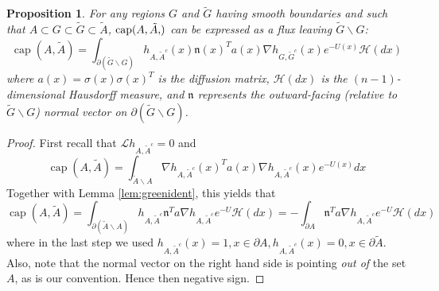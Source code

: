 \documentclass[nofootinbib,english, aip, jcp, priprint, graphicx,floatfix]{revtex4-1}
\newcommand{\tmop}[1]{\ensuremath{\operatorname{#1}}}
\newtheorem{proposition}{Proposition}
\theoremstyle{plain}
\theoremstyle{definition}
\theoremstyle{plain}
\newcommand{\normal}{{\mathfrak{n}}}
\newcommand{\capac}[2]{\ensuremath{\operatorname{cap}}(#1,#2)}
\newcommand{\hausdorffmeasure}{\mathscr{H}(dx)}
\newcommand{\tA}{{\tilde A}}
\begin{document}
\def\theproposition{\ref{prop:flux}}
\begin{proposition}
For any regions $G$ and $\tilde{G}$ having smooth boundaries and such that $A\subset G \subset \tilde G \subset \tilde A$, $\capac{A,\tA}$ can be expressed as a flux leaving $\tilde G \backslash G$:
\[
\ensuremath{\operatorname{cap}} (A, \tilde{A}) = \int_{\partial (\tilde G \backslash G)}  h_{A, \tilde{A}^c} (x)   \normal(x)^T a (x) \nabla h_{G, \tilde{G}^c} (x)e^{- U (x)} \hausdorffmeasure
\]
where $a(x)=\sigma(x)\sigma(x)^T$ is the diffusion matrix, $\hausdorffmeasure$ is the $(n-1)$-dimensional Hausdorff measure, and $\normal$ represents the outward-facing (relative to $\tilde G \backslash G$) normal vector on $\partial (\tilde G \backslash G)$.
\end{proposition}
\addtocounter{proposition}{-1}
\begin{proof}
First recall that $\mathcal{L} h_{A, \tilde{A}^c} = 0$ and
\begin{equation*}
	\tmop{cap}(A,\tilde A) = \int_{\tilde A \backslash A} \nabla h_{A, \tilde{A}^c} (x)^T a(x) \nabla h_{A, \tilde{A}^c} (x) e^{-U(x)} dx
\end{equation*}
Together with Lemma \ref{lem:greenident}, this yields that
\begin{equation}\label{eq:lemmaproof}
\tmop{cap}(A,\tilde A)  = \int_{\partial (\tilde A \backslash A)}  h_{A, \tilde{A}^c} \normal^T a  \nabla h_{A, \tilde{A}^c} e^{- U } \hausdorffmeasure = -\int_{\partial A}  \normal^T a  \nabla h_{A, \tilde{A}^c} e^{- U } \hausdorffmeasure
\end{equation}
where in the last step we used $h_{A,\tilde A^c}(x)=1,x\in \partial A,h_{A,\tilde A^c}(x)=0,x\in \partial \tilde A$.  Also, note that the normal vector on the right hand side is pointing {\em out of} the set $A$, as is our convention. Hence then negative sign.


\end{proof}
\end{document}
